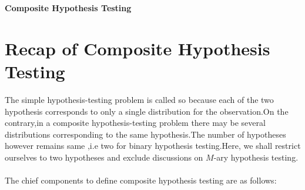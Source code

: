 \documentclass[12pt]{report}
\begin{document}
\maketitle

\begin{center}
{\Large \bf Composite Hypothesis Testing}
\end{center}



\section{Recap of Composite Hypothesis Testing}

The simple hypothesis-testing problem is called so because each of the two hypothesis corresponds to only a single distribution for the observation.On the contrary,in a composite hypothesis-testing problem there may be several distributions corresponding to the same hypothesis.The number of hypotheses however remains same ,i.e two for binary hypothesis testing.Here, we shall restrict ourselves to two hypotheses and exclude discussions on $M$-ary hypothesis testing.
\\
\\ The chief components to define composite hypothesis testing are as follows:
\end{document}
